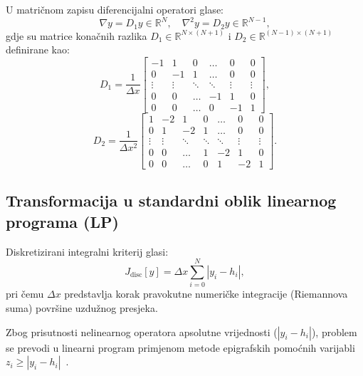 U matričnom zapisu diferencijalni operatori glase:
\begin{equation}
\nabla y = D_1 y \in \mathbb{R}^N, \quad \nabla^2 y = D_2 y \in \mathbb{R}^{N-1},
\end{equation}
gdje su matrice konačnih razlika $D_1 \in \mathbb{R}^{N \times (N+1)}$ i $D_2 \in \mathbb{R}^{(N-1) \times (N+1)}$ definirane kao:
\begin{equation}
D_1 = \frac{1}{\Delta x} \begin{bmatrix}
-1 & 1 & 0 & \dots & 0 & 0 \\
0 & -1 & 1 & \dots & 0 & 0 \\
\vdots & \vdots & \ddots & \ddots & \vdots & \vdots \\
0 & 0 & \dots & -1 & 1 & 0 \\
0 & 0 & \dots & 0 & -1 & 1
\end{bmatrix},
\end{equation}
\begin{equation}
D_2 = \frac{1}{\Delta x^2} \begin{bmatrix}
1 & -2 & 1 & 0 & \dots & 0 & 0 \\
0 & 1 & -2 & 1 & \dots & 0 & 0 \\
\vdots & \vdots & \ddots & \ddots & \ddots & \vdots & \vdots \\
0 & 0 & \dots & 1 & -2 & 1 & 0 \\
0 & 0 & \dots & 0 & 1 & -2 & 1
\end{bmatrix}.
\end{equation}

\subsection{Transformacija u standardni oblik linearnog programa (LP)}

Diskretizirani integralni kriterij glasi:
\begin{equation}
J_{\mathrm{disc}}[y] = \Delta x \sum_{i=0}^N |y_i - h_i|,
\label{eq:road_disc_obj}
\end{equation}
pri čemu $\Delta x$ predstavlja korak pravokutne numeričke integracije (Riemannova suma) površine uzdužnog presjeka.

Zbog prisutnosti nelinearnog operatora apsolutne vrijednosti ($|y_i - h_i|$), problem se prevodi u linearni program primjenom metode epigrafskih pomoćnih varijabli $z_i \geq |y_i - h_i|$~\cite{boyd2004convex,nocedal2006numerical}.

